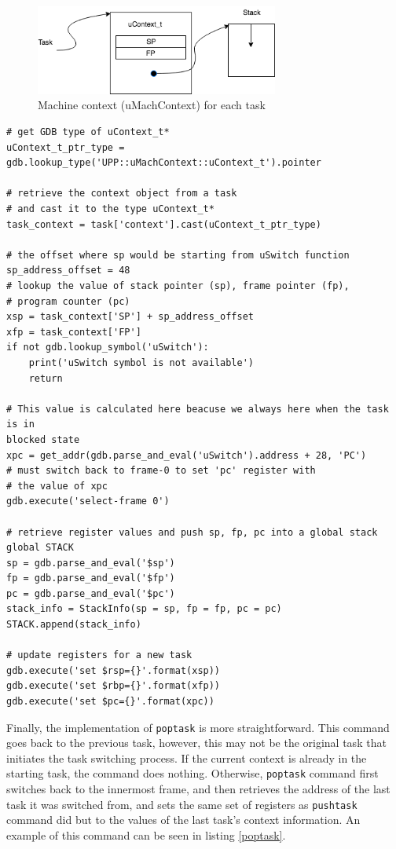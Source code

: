 \begin{figure}[h]
    \caption{Machine context (uMachContext) for each task}
    \includegraphics[width=8cm]{uContext_stack}
    \centering
\end{figure}

\begin{lstlisting}[style=Python, caption={Abridged \text{push\_task} source
code}, label={pushtask-code}, basicstyle=\small]
# get GDB type of uContext_t*
uContext_t_ptr_type = gdb.lookup_type('UPP::uMachContext::uContext_t').pointer

# retrieve the context object from a task
# and cast it to the type uContext_t*
task_context = task['context'].cast(uContext_t_ptr_type)

# the offset where sp would be starting from uSwitch function
sp_address_offset = 48
# lookup the value of stack pointer (sp), frame pointer (fp),
# program counter (pc)
xsp = task_context['SP'] + sp_address_offset
xfp = task_context['FP']
if not gdb.lookup_symbol('uSwitch'):
    print('uSwitch symbol is not available')
    return

# This value is calculated here beacuse we always here when the task is in
blocked state
xpc = get_addr(gdb.parse_and_eval('uSwitch').address + 28, 'PC')
# must switch back to frame-0 to set 'pc' register with
# the value of xpc
gdb.execute('select-frame 0')

# retrieve register values and push sp, fp, pc into a global stack
global STACK
sp = gdb.parse_and_eval('$sp')
fp = gdb.parse_and_eval('$fp')
pc = gdb.parse_and_eval('$pc')
stack_info = StackInfo(sp = sp, fp = fp, pc = pc)
STACK.append(stack_info)

# update registers for a new task
gdb.execute('set $rsp={}'.format(xsp))
gdb.execute('set $rbp={}'.format(xfp))
gdb.execute('set $pc={}'.format(xpc))
\end{lstlisting}

Finally, the implementation of \verb|poptask| is more straightforward. This command goes back to the previous task, however, this may not be the original
task that initiates the task switching process. If the current context is
already in the starting task, the command does nothing. Otherwise,
\verb|poptask| command first switches back to the innermost frame, and then
retrieves the
address of the last task it was switched from, and sets the same set of registers as
\verb|pushtask| command did but to the values of the last task's context
information. An example of this command can be seen in listing \ref{poptask}.

